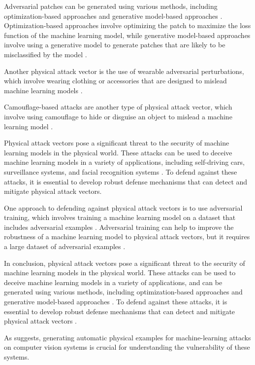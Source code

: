 \documentclass[11pt,a4paper]{article}
\begin{document}
Adversarial patches can be generated using various methods, including optimization-based approaches and generative model-based approaches \cite{doi:10.1145/3128572.3140444}. Optimization-based approaches involve optimizing the patch to maximize the loss function of the machine learning model, while generative model-based approaches involve using a generative model to generate patches that are likely to be misclassified by the model \cite{arxiv:1606.03498}. 

Another physical attack vector is the use of wearable adversarial perturbations, which involve wearing clothing or accessories that are designed to mislead machine learning models \cite{arxiv:1805.06605}. 

Camouflage-based attacks are another type of physical attack vector, which involve using camouflage to hide or disguise an object to mislead a machine learning model \cite{arxiv:1511.05644}. 

Physical attack vectors pose a significant threat to the security of machine learning models in the physical world. These attacks can be used to deceive machine learning models in a variety of applications, including self-driving cars, surveillance systems, and facial recognition systems \cite{doi:10.1201/9781351251389-8}. To defend against these attacks, it is essential to develop robust defense mechanisms that can detect and mitigate physical attack vectors.

One approach to defending against physical attack vectors is to use adversarial training, which involves training a machine learning model on a dataset that includes adversarial examples \cite{arxiv:1901.10513}. Adversarial training can help to improve the robustness of a machine learning model to physical attack vectors, but it requires a large dataset of adversarial examples \cite{arxiv:1902.06705}. 

In conclusion, physical attack vectors pose a significant threat to the security of machine learning models in the physical world. These attacks can be used to deceive machine learning models in a variety of applications, and can be generated using various methods, including optimization-based approaches and generative model-based approaches \cite{arxiv:2001.05574}. To defend against these attacks, it is essential to develop robust defense mechanisms that can detect and mitigate physical attack vectors \cite{doi:10.1109/access.2022.3216291}. 

As \cite{doi:10.1109/eurosp53844.2022.00047} suggests, generating automatic physical examples for machine-learning attacks on computer vision systems is crucial for understanding the vulnerability of these systems. 
\end{document}
